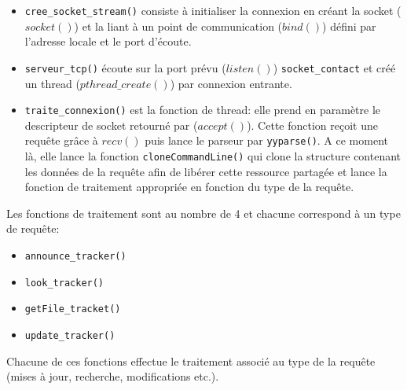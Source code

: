 \begin{itemize}
\item \texttt{cree\_socket\_stream()} consiste à initialiser la connexion en créant la socket ($socket()$) et la liant à un point de communication ($bind()$) défini par l'adresse locale et le port d'écoute.
\item \texttt{serveur\_tcp()} écoute sur la port prévu ($listen()$) \texttt{socket\_contact} et créé un thread ($pthread\_create()$) par connexion entrante.
\item \texttt{traite\_connexion()} est la fonction de thread: elle prend en paramètre le descripteur de socket retourné par ($accept()$). Cette fonction reçoit une requête grâce à $recv()$ puis lance le parseur par \texttt{yyparse()}. A ce moment là, elle lance la fonction \texttt{cloneCommandLine()} qui clone la structure contenant les données de la requête afin de libérer cette ressource partagée et lance la fonction de traitement appropriée en fonction du type de la requête.
\end{itemize}

Les fonctions de traitement sont au nombre de 4 et chacune correspond à un type de requête:

\begin{itemize}
\item \texttt{announce\_tracker()}
\item \texttt{look\_tracker()}
\item \texttt{getFile\_tracket()}
\item \texttt{update\_tracker()}
\end{itemize}

Chacune de ces fonctions effectue le traitement associé au type de la requête (mises à jour, recherche, modifications etc.).        
